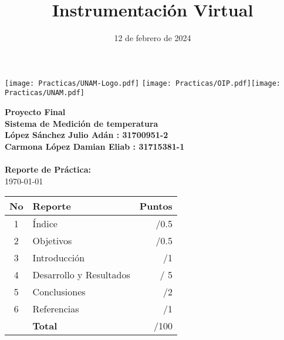 \documentclass[a4paper,11pt, titlepage, twoside]{article}
\title{Instrumentación Virtual}
\author{}
\date{12 de febrero de 2024}
\begin{document}
\begin{titlepage}



 \texttt{[image: Practicas/UNAM-Logo.pdf]}   \texttt{[image: Practicas/OIP.pdf]}\hfill\texttt{[image: Practicas/UNAM.pdf]}

 
  \vspace{40mm}
    \hspace{2mm}
\centering
    {\Huge \textbf{Proyecto Final}}\\
    \vspace{5mm}
    {\Large \textbf{Sistema de Medición de temperatura}}\\
    \Large \textbf{López Sánchez Julio Adán : 31700951-2}\\
    \Large \textbf{Carmona López Damian Eliab : 31715381-1}\\
    \vspace{20mm}
    \Huge \textcolor{Blue}{\textbf{\thetitle}}\\
    \vspace{10mm}
    \Large\textbf{Reporte de Práctica:}\\
    \vspace{10mm}
    \Large\today\\  %
    
    \hspace{2mm}
    \theauthor

\begin{tabular}{|c|l|r|}
\hline
\textbf{No} & \textbf{Reporte} & \textbf{Puntos} \\
\hline 
\hline
  1 &  Índice & /0.5 \\
\hline
 2 &   Objetivos & /0.5 \\
 \hline
  3 &    Introducción  & /1 \\
  \hline
   4 &    Desarrollo y Resultados & / 5 \\
   \hline
    5 &    Conclusiones  & /2 \\
    \hline
  6 &    Referencias  & /1 \\
\hline
\hline
  &    \textbf{Total}  & /100 \\
\hline
\end{tabular}\\

    \end{titlepage}
\end{document}
